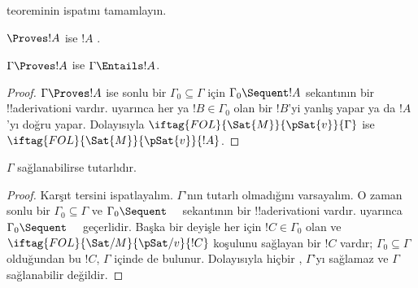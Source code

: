 \documentclass[../../../include/open-logic-section]{subfiles}
\begin{document}
\begin{prob}
 teoreminin ispatını tamamlayın.
\end{prob}
\tagendprob

\begin{cor}
$\Proves !A$ ise $!A$ .
\end{cor}

\begin{cor}
$\Gamma\Proves !A$ ise $\Gamma\Entails !A$.
\end{cor}

\begin{proof}
$\Gamma\Proves !A$ ise sonlu bir $\Gamma_0\subseteq\Gamma$ için
$\Gamma_0\Sequent !A$ sekantının bir !!a{derivation}{}i vardır.
 uyarınca her
 ya
  $!B\in\Gamma_0$ olan bir $!B$'yi yanlış yapar ya da $!A$'yı doğru yapar.
Dolayısıyla $\iftag{FOL}{\Sat{M}}{\pSat{v}}{\Gamma}$ ise
$\iftag{FOL}{\Sat{M}}{\pSat{v}}{!A}$.
\end{proof}

\begin{cor}
$\Gamma$ sağlanabilirse tutarlıdır.
\end{cor}

\begin{proof}
Karşıt tersini ispatlayalım. $\Gamma$'nın tutarlı olmadığını varsayalım. O
zaman sonlu bir $\Gamma_0\subseteq\Gamma$ ve $\Gamma_0\Sequent\quad$
sekantının bir !!a{derivation}{}i vardır. 
uyarınca $\Gamma_0\Sequent\quad$ geçerlidir. Başka bir deyişle her
 için
  $!C\in\Gamma_0$ olan ve $\iftag{FOL}{\Sat/{M}}{\pSat/{v}}{!C}$ koşulunu
  sağlayan bir $!C$
vardır; $\Gamma_0\subseteq\Gamma$ olduğundan bu $!C$, $\Gamma$ içinde de
bulunur. Dolayısıyla hiçbir ,
$\Gamma$'yı sağlamaz ve $\Gamma$ sağlanabilir değildir.
\end{proof}
\end{document}
